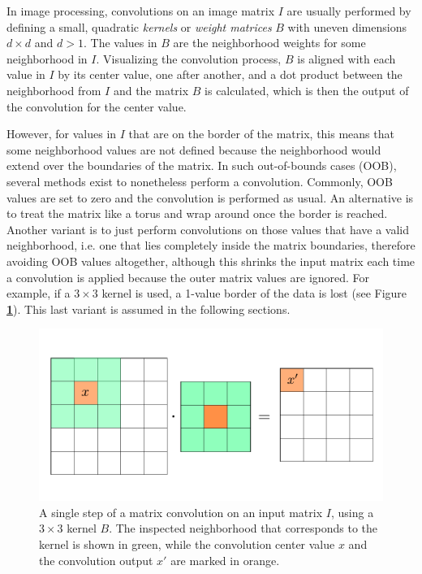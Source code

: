 In image processing, convolutions on an image matrix $I$ are usually performed by defining a small, quadratic \textit{kernels} or \textit{weight matrices} $B$ with uneven dimensions $d \times d$ and $d > 1$. The values in $B$ are the neighborhood weights for some neighborhood in $I$. Visualizing the convolution process, $B$ is aligned with each value in $I$ by its center value, one after another, and a dot product between the neighborhood from $I$ and the matrix $B$ is calculated, which is then the output of the convolution for the center value.

However, for values in $I$ that are on the border of the matrix, this means that some neighborhood values are not defined because the neighborhood would extend over the boundaries of the matrix. In such out-of-bounds cases (OOB), several methods exist to nonetheless perform a convolution. Commonly, OOB values are set to zero and the convolution is performed as usual. An alternative is to treat the matrix like a torus and wrap around once the border is reached. Another variant is to just perform convolutions on those values that have a valid neighborhood, i.e. one that lies completely inside the matrix boundaries, therefore avoiding OOB values altogether, although this shrinks the input matrix each time a convolution is applied because the outer matrix values are ignored. For example, if a $3 \times 3$ kernel is used, a 1-value border of the data is lost (see Figure \textbf{\ref{fig:convolution}}). This last variant is assumed in the following sections.\\

\begin {figure}[!ht]
	\begin{center}
		\includegraphics[scale=0.55]{img/fig_convolution}
	\end{center}
	\caption[Matrix convolution.]{A single step of a matrix convolution on an input matrix $I$, using a $3 \times 3$ kernel $B$. The inspected neighborhood that corresponds to the kernel is shown in green, while the convolution center value $x$ and the convolution output $x'$ are marked in orange.}
	\label{fig:convolution}
\end {figure}

